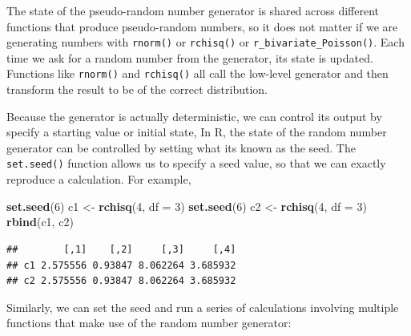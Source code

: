 \documentclass[
]{book}
\newenvironment{Shaded}{\begin{snugshade}}{\end{snugshade}}
\newcommand{\AttributeTok}[1]{\textcolor[rgb]{0.13,0.29,0.53}{#1}}
\newcommand{\DecValTok}[1]{\textcolor[rgb]{0.00,0.00,0.81}{#1}}
\newcommand{\FunctionTok}[1]{\textcolor[rgb]{0.13,0.29,0.53}{\textbf{#1}}}
\newcommand{\NormalTok}[1]{#1}
\newcommand{\OtherTok}[1]{\textcolor[rgb]{0.56,0.35,0.01}{#1}}
\begin{document}
The state of the pseudo-random number generator is shared across different functions that produce pseudo-random numbers, so it does not matter if we are generating numbers with \texttt{rnorm()} or \texttt{rchisq()} or \texttt{r\_bivariate\_Poisson()}.
Each time we ask for a random number from the generator, its state is updated.
Functions like \texttt{rnorm()} and \texttt{rchisq()} all call the low-level generator and then transform the result to be of the correct distribution.

Because the generator is actually deterministic, we can control its output by specify a starting value or initial state,
In R, the state of the random number generator can be controlled by setting what its known as the seed.
The \texttt{set.seed()} function allows us to specify a seed value, so that we can exactly reproduce a calculation.
For example,

\begin{Shaded}
\begin{Highlighting}[]
\FunctionTok{set.seed}\NormalTok{(}\DecValTok{6}\NormalTok{)}
\NormalTok{c1 }\OtherTok{\textless{}{-}} \FunctionTok{rchisq}\NormalTok{(}\DecValTok{4}\NormalTok{, }\AttributeTok{df =} \DecValTok{3}\NormalTok{)}
\FunctionTok{set.seed}\NormalTok{(}\DecValTok{6}\NormalTok{)}
\NormalTok{c2 }\OtherTok{\textless{}{-}} \FunctionTok{rchisq}\NormalTok{(}\DecValTok{4}\NormalTok{, }\AttributeTok{df =} \DecValTok{3}\NormalTok{)}
\FunctionTok{rbind}\NormalTok{(c1, c2)}
\end{Highlighting}
\end{Shaded}

\begin{verbatim}
##        [,1]    [,2]     [,3]     [,4]
## c1 2.575556 0.93847 8.062264 3.685932
## c2 2.575556 0.93847 8.062264 3.685932
\end{verbatim}

Similarly, we can set the seed and run a series of calculations involving multiple functions that make use of the random number generator:
\end{document}
